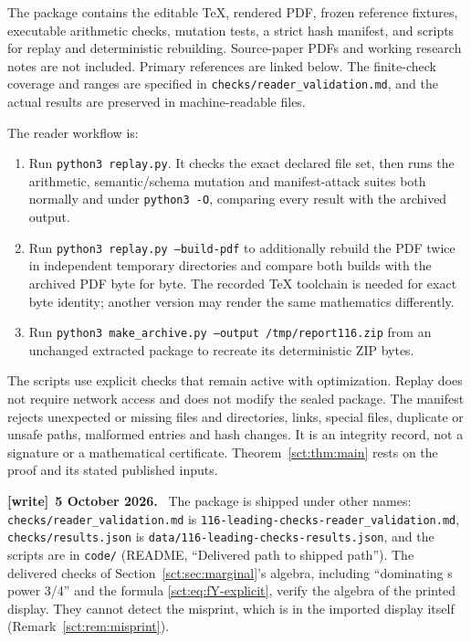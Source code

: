 \documentclass[11pt,letterpaper]{article}
\newcommand{\file}[1]{\nolinkurl{#1}}
\theoremstyle{definition}\newtheorem{remark}[theorem]{Remark}
\newenvironment{writenote}[1][]{\par\smallskip\begingroup\small
 \noindent\textbf{[write]}\if\relax\detokenize{#1}\relax\else~\textbf{#1.}\fi\ }%
 {\par\endgroup\smallskip}
\begin{document}
The package contains the editable TeX, rendered PDF, frozen reference
fixtures, executable arithmetic checks, mutation tests, a strict hash manifest,
and scripts for replay and deterministic rebuilding. Source-paper PDFs and
working research notes are not included. Primary references are linked below.
The finite-check coverage and ranges are specified in
\texttt{checks/reader\_validation.md}, and the actual results are preserved
in machine-readable files.

The reader workflow is:
\begin{enumerate}
\item Run \texttt{python3 replay.py}. It checks the exact declared file set,
then runs the arithmetic, semantic/schema mutation and manifest-attack suites
both normally and under \texttt{python3 -O}, comparing every result with the
archived output.
\item Run \texttt{python3 replay.py --build-pdf} to additionally rebuild the
PDF twice in independent temporary directories and compare both builds with
the archived PDF byte for byte. The recorded TeX toolchain is needed for exact
byte identity; another version may render the same mathematics differently.
\item Run \texttt{python3 make\_archive.py --output /tmp/report116.zip} from an
unchanged extracted package to recreate its deterministic ZIP bytes.
\end{enumerate}
The scripts use explicit checks that remain active with optimization. Replay
does not require network access and does not modify the sealed package.
The manifest rejects unexpected or missing files and directories, links,
special files, duplicate or unsafe paths, malformed entries and hash changes.
It is an integrity record, not a signature or a mathematical certificate.
Theorem~\ref{sct:thm:main} rests on the proof and its stated published inputs.
\begin{writenote}[5 October 2026]
The package is shipped under other names: \file{checks/reader_validation.md} is \file{116-leading-checks-reader_validation.md}, \file{checks/results.json} is \file{data/116-leading-checks-results.json}, and the scripts are in \file{code/} (README, ``Delivered path to shipped path''). The delivered checks of Section~\ref{sct:sec:marginal}'s algebra, including ``dominating s power 3/4'' and the formula \eqref{sct:eq:fY-explicit}, verify the algebra of the printed display. They cannot detect the misprint, which is in the imported display itself (Remark~\ref{sct:rem:misprint}).
\end{writenote}
\end{document}
